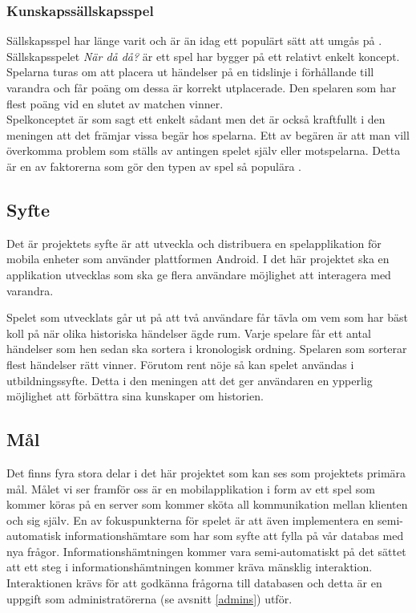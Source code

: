 \documentclass[a4paper, 11pt]{article}
\begin{document}
\subsubsection{Kunskapssällskapsspel}
Sällskapsspel har länge varit och är än idag ett populärt sätt att umgås på \cite{bradspelspop}. Sällskapsspelet \textit{När då då?} \cite{nardada} är ett spel har bygger på ett relativt enkelt koncept. Spelarna turas om att placera ut händelser på en tidslinje i förhållande till varandra och får poäng om dessa är korrekt utplacerade. Den spelaren som har flest poäng vid en slutet av matchen vinner. \\
Spelkonceptet är som sagt ett enkelt sådant men det är också kraftfullt i den meningen att det främjar vissa begär hos spelarna. Ett av begären är att man vill överkomma problem som ställs av antingen spelet själv eller motspelarna. Detta är en av faktorerna som gör den typen av spel så populära \cite{psykologi}.

\subsection{Syfte}
Det är projektets syfte är att utveckla och distribuera en spelapplikation för mobila enheter som använder plattformen Android. I det här projektet ska en applikation utvecklas som ska ge flera användare möjlighet att interagera med varandra.

Spelet som utvecklats går ut på att två användare får tävla om vem som har bäst koll på när olika historiska händelser ägde rum. Varje spelare får ett antal händelser som hen sedan ska sortera i kronologisk ordning. Spelaren som sorterar flest händelser rätt vinner. Förutom rent nöje så kan spelet användas i utbildningssyfte. Detta i den meningen att det ger användaren en ypperlig möjlighet att förbättra sina kunskaper om historien.

\subsection{Mål}
Det finns fyra stora delar i det här projektet som kan ses som projektets primära mål. Målet vi ser framför oss är en mobilapplikation i form av ett spel som kommer köras på en server som kommer sköta all kommunikation mellan klienten och sig själv. En av fokuspunkterna för spelet är att även implementera en semi-automatisk informationshämtare som har som syfte att fylla på vår databas med nya frågor. Informationshämtningen kommer vara semi-automatiskt på det sättet att ett steg i informationshämtningen kommer kräva mänsklig interaktion. Interaktionen krävs för att godkänna frågorna till databasen och detta är en uppgift som administratörerna (se avsnitt \ref{admins}) utför. 
\end{document}
